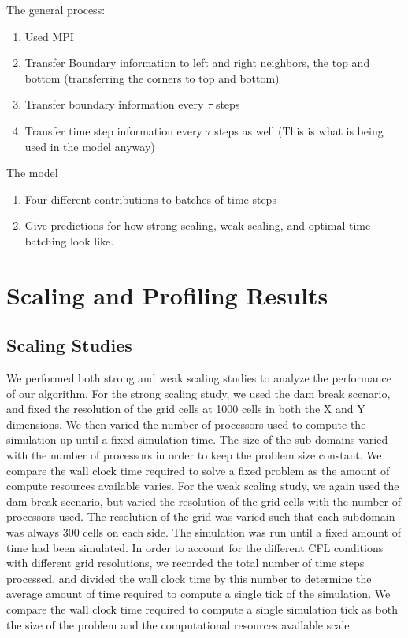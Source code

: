 \documentclass{article}
\begin{document}
The general process:
\begin{enumerate}
	\item Used MPI
	\item Transfer Boundary information to left and right neighbors, the top and bottom (transferring the corners to top and bottom)
	\item Transfer boundary information every $\tau$ steps
	\item Transfer time step information every $\tau$ steps as well (This is what is being used in the model anyway)
\end{enumerate}
The model
\begin{enumerate}
	\item Four different contributions to batches of time steps
	\item Give predictions for how strong scaling, weak scaling, and optimal time batching look like.
\end{enumerate}

\section{Scaling and Profiling Results}
\subsection{Scaling Studies}

We performed both strong and weak scaling studies to analyze the performance of our algorithm. For the strong scaling study, we used the dam break scenario, and fixed the resolution of the grid cells at 1000 cells in both the X and Y dimensions. We then varied the number of processors used to compute the simulation up until a fixed simulation time. The size of the sub-domains varied with the number of processors in order to keep the problem size constant. We compare the wall clock time required to solve a fixed problem as the amount of compute resources available varies. For the weak scaling study, we again used the dam break scenario, but varied the resolution of the grid cells with the number of processors used. The resolution of the grid was varied such that each subdomain was always 300 cells on each side. The simulation was run until a fixed amount of time had been simulated. In order to account for the different CFL conditions with different grid resolutions, we recorded the total number of time steps processed, and divided the wall clock time by this number to determine the average amount of time required to compute a single tick of the simulation. We compare the wall clock time required to compute a single simulation tick as both the size of the problem and the computational resources available scale.
\end{document}
